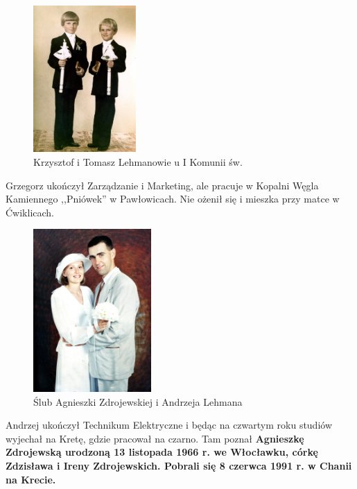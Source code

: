 \begin{figure}[!h]
\begin{center}
\includegraphics[width=0.35\textwidth]{photo/krzysztof_tomasz_lehman.jpg}
\caption{Krzysztof i Tomasz Lehmanowie u I Komunii św. }
\label{rys:krzysztof_tomasz_lehman}
\end{center}
\end{figure}

Grzegorz ukończył Zarządzanie i Marketing, ale pracuje w Kopalni Węgla Kamiennego ,,Pniówek'' w Pawłowicach. Nie ożenił się i mieszka przy matce w Ćwiklicach.

\begin{figure}[!h]
\begin{center}
\includegraphics[width=0.4\textwidth]{photo/agnieszka_andrzej_lehman_slub.jpg}
\caption{Ślub Agnieszki Zdrojewskiej i Andrzeja Lehmana}
\label{rys:agnieszka_andrzej_lehman_slub}
\end{center}
\end{figure}

Andrzej ukończył Technikum Elektryczne i będąc na czwartym roku studiów wyjechał na Kretę, gdzie pracował na czarno. Tam poznał \textbf{Agnieszkę Zdrojewską urodzoną 13 listopada 1966 r. we Włocławku, córkę Zdzisława i Ireny Zdrojewskich. Pobrali się 8 czerwca 1991 r. w Chanii na Krecie.}


